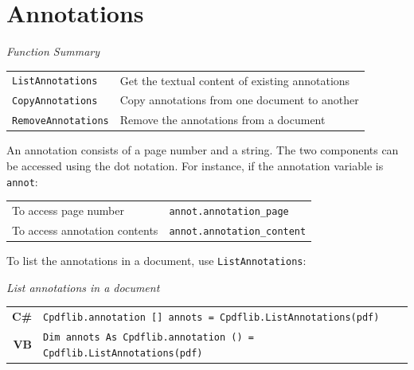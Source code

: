 \documentclass[a4paper]{memoir}
\begin{document}
\chapter{Annotations}
\begin{framed}
\noindent\textit{Function Summary}\\[2mm]
\noindent\begin{tabular}{ll}
\verb!ListAnnotations! & Get the textual content of existing annotations\\
\verb!CopyAnnotations! & Copy annotations from one document to another\\
\verb!RemoveAnnotations! & Remove the annotations from a document
\end{tabular}
\end{framed}
An annotation consists of a page number and a string. The two components can be accessed using the dot notation. For instance, if the annotation variable is \verb!annot!:

\begin{framed}
  \begin{tabular}{ll}
    To access page number & \verb!annot.annotation_page!\\
    To access annotation contents & \verb!annot.annotation_content!
  \end{tabular}
\end{framed}

To list the annotations in a document, use \verb!ListAnnotations!:
\begin{framed}
\noindent\textit{List annotations in a document}

\vspace{2mm}
\noindent\begin{tabular}{rl}
\small\sffamily\textbf{C\#} &
\begin{minipage}{4in}
\small\verb!Cpdflib.annotation [] annots = Cpdflib.ListAnnotations(pdf)!
\end{minipage}\\[5mm]
\small\sffamily\textbf{VB} &
\begin{minipage}{4in}
\small\verb!Dim annots As Cpdflib.annotation () =!
\small\verb!  Cpdflib.ListAnnotations(pdf)!
\end{minipage}\\[5mm]
\end{tabular}
\end{framed}
\end{document}
